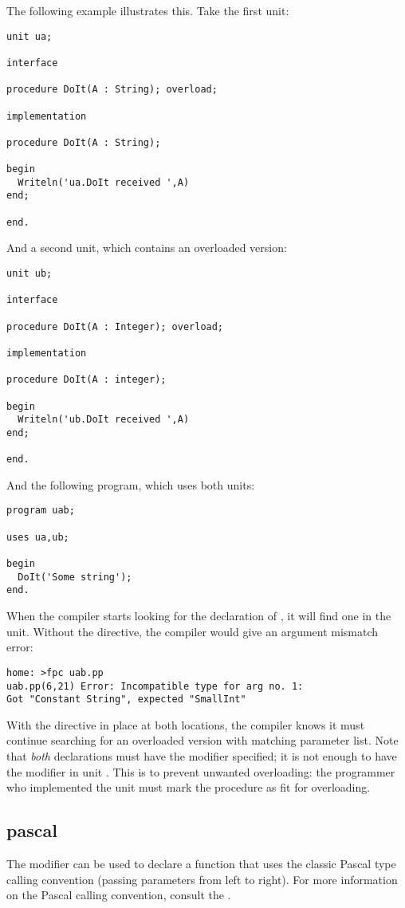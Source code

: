 The following example illustrates this. Take the first unit:
\begin{verbatim}
unit ua;

interface

procedure DoIt(A : String); overload;

implementation

procedure DoIt(A : String);

begin
  Writeln('ua.DoIt received ',A)
end;

end.
\end{verbatim}
And a second unit, which contains an overloaded version:
\begin{verbatim}
unit ub;

interface

procedure DoIt(A : Integer); overload;

implementation

procedure DoIt(A : integer);

begin
  Writeln('ub.DoIt received ',A)
end;

end.
\end{verbatim}
And the following program, which uses both units:
\begin{verbatim}
program uab;

uses ua,ub;

begin
  DoIt('Some string');
end.
\end{verbatim}
When the compiler starts looking for the declaration of , it will
find one in the  unit. Without the  directive, the 
compiler would give an argument mismatch error:
\begin{verbatim}
home: >fpc uab.pp
uab.pp(6,21) Error: Incompatible type for arg no. 1: 
Got "Constant String", expected "SmallInt"
\end{verbatim}
With the  directive in place at both locations, the compiler
knows it must continue searching for an overloaded version with matching
parameter list. Note that {\em both} declarations must have the
 modifier specified; it is not enough to have the modifier in
unit . This is to prevent unwanted overloading: the programmer who
implemented the  unit must mark the procedure as fit for overloading.

%
%
\subsection{pascal}
\label{se:pascal}
The  modifier can be used to declare a function that uses the
classic Pascal type calling convention (passing parameters from left to right).
For more information on the Pascal calling convention, consult the \progref.

